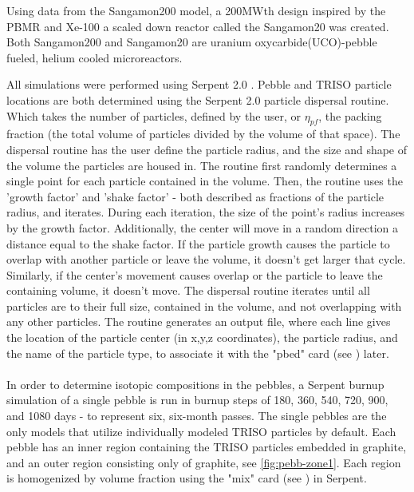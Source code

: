Using data from the Sangamon200 model, a 200MWth design inspired by the PBMR and Xe-100 a scaled down reactor called the Sangamon20 was created.  Both Sangamon200 and Sangamon20 are uranium oxycarbide(UCO)-pebble fueled, helium cooled microreactors.



All simulations were performed using Serpent 2.0 \cite{leppanenjaakko_serpent_2015}.  Pebble and TRISO particle locations are both determined using the Serpent 2.0 particle dispersal routine.  Which takes the number of particles, defined by the user, or $\eta_{pf}$, the packing fraction (the total volume of particles divided by the volume of that space).  The dispersal routine has the user define the particle radius, and the size and shape of the volume the particles are housed in.  The routine first randomly determines a single point for each particle contained in the volume.  Then, the routine uses the 'growth factor' and 'shake factor' - both described as fractions of the particle radius, and iterates.  During each iteration, the size of the point's radius increases by the growth factor.  Additionally, the center will move in a random direction a distance equal to the shake factor.  If the particle growth causes the particle to overlap with another particle or leave the volume, it doesn't get larger that cycle.  Similarly, if the center's movement causes overlap or the particle to leave the containing volume, it doesn't move.  The dispersal routine iterates until all particles are to their full size, contained in the volume, and not overlapping with any other particles.  The routine generates an output file, where each line gives the location of the particle center (in x,y,z coordinates), the particle radius, and the name of the particle type, to associate it with the "pbed" card (see \cite{leppanenjaakko_serpent_2015}) later.
\\ \\

In order to determine isotopic compositions in the pebbles, a Serpent burnup simulation of a single pebble is run in burnup steps of 180, 360, 540, 720, 900, and 1080 days - to represent six, six-month passes.  The single pebbles are the only models that utilize individually modeled TRISO particles by default.  Each pebble has an inner region containing the TRISO particles embedded in graphite, and an outer region consisting only of graphite, see \ref{fig:pebb-zone1}.  Each region is homogenized by volume fraction using the "mix" card (see \cite{leppanenjaakko_serpent_2015}) in Serpent.

